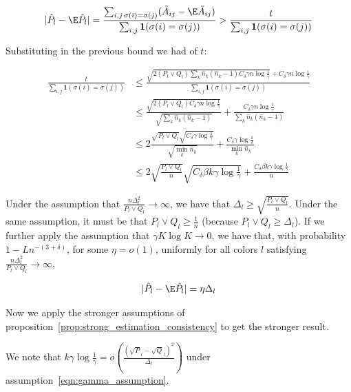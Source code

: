 \documentclass{article}
\begin{document}
\begin{align*}
| \hat{P}_l - \E \hat{P}_l | =
\frac{\sum_{i,j \, \sigma(i) = \sigma(j)} (\tilde{A}_{ij} - \E \tilde{A}_{ij} ) }{
  \sum_{i,j} \mathbf{1}( \sigma(i) = \sigma(j) ) } &> 
  \frac{t}{\sum_{i,j} \mathbf{1}(\sigma(i) = \sigma(j)) } \\
\end{align*}

Substituting in the previous bound we had of $t$:

\begin{align*}
 \frac{t}{\sum_{i,j} \mathbf{1}(\sigma(i) = \sigma(j)) } &\leq
   \frac{  \sqrt{  2 (P_l \vee Q_l) \sum_k \hat{n}_k (\hat{n}_k - 1) C_\delta \gamma n \log \frac{1}{\gamma} } + C_\delta \gamma n \log \frac{1}{\gamma} }
        { \sum_{i,j} \mathbf{1}(\sigma(i) = \sigma(j) ) }  \\
  &\leq \frac{\sqrt{2 (P_l \vee Q_l) C_\delta \gamma n \log \frac{1}{\gamma}}}
             {\sqrt{ \sum_k \hat{n}_k (\hat{n}_k - 1)}} + 
          \frac{C_\delta \gamma n \log \frac{1}{\gamma}}
             {\sum_k \hat{n}_k (\hat{n}_k - 1)} \\
 &\leq 2 \frac{ \sqrt{P_l\vee Q_l} \sqrt{ C_\delta \gamma \log \frac{1}{\gamma}} }
           {\sqrt{ \min_k \hat{n}_k}} + 
       \frac{C_\delta \gamma \log \frac{1}{\delta}}{\min_k \hat{n}_k} \\
 &\leq 2 \sqrt{ \frac{P_l \vee Q_l}{n} } \sqrt{C_\delta \beta k \gamma \log \frac{1}{\gamma}} + 
       \frac{C_\delta \beta k \gamma \log \frac{1}{\gamma}}{n} 
\end{align*}

Under the assumption that $\frac{ n \Delta_l^2}{P_l \vee Q_l} \rightarrow \infty$, we have that $\Delta_l \geq \sqrt{ \frac{P_l \vee Q_l}{n}}$. Under the same assumption, it must be that $P_l \vee Q_l \geq \frac{1}{n}$ (because $P_l \vee Q_l \geq \Delta_l$). If we further apply the assumption that $\gamma K \log K \rightarrow 0$, we have that, with probability $1 - L n^{-(3+\delta)}$, for some $\eta = o(1)$, uniformly for all colors $l$ satisfying $\frac{n \Delta_l^2}{P_l \vee Q_l} \rightarrow \infty$, 

\begin{align*}
| \hat{P}_l - \E \hat{P}_l | = \eta \Delta_l
\end{align*}

Now we apply the stronger assumptions of proposition~\ref{prop:strong_estimation_consistency} to get the stronger result. 

We note that $k \gamma \log \frac{1}{\gamma} = o\left( \frac{(\sqrt{P}_l - \sqrt{Q}_l)^2}{\Delta_l} \right)$ under assumption~\ref{eqn:gamma_assumption}. 
\end{document}
